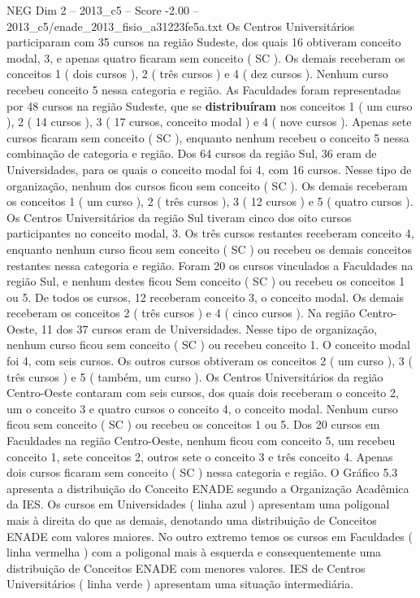 \begin{textsample}{NEG Dim 2 – 2013\_c5 – Score -2.00 – 2013\_c5/enade\_2013\_fisio\_a31223fe5a.txt}
Os Centros Universitários participaram com 35 cursos na região Sudeste, dos quais 16 obtiveram conceito modal, 3, e apenas quatro ficaram sem conceito ( SC ).
Os demais receberam os conceitos 1 ( dois cursos ), 2 ( três cursos ) e 4 ( dez cursos ).
Nenhum curso recebeu conceito 5 nessa categoria e região.
As Faculdades foram representadas por 48 cursos na região Sudeste, que se \textbf{distribuíram} nos conceitos 1 ( um curso ), 2 ( 14 cursos ), 3 ( 17 cursos, conceito modal ) e 4 ( nove cursos ).
Apenas sete cursos ficaram sem conceito ( SC ), enquanto nenhum recebeu o conceito 5 nessa combinação de categoria e região.
Dos 64 cursos da região Sul, 36 eram de Universidades, para os quais o conceito modal foi 4, com 16 cursos.
Nesse tipo de organização, nenhum dos cursos ficou sem conceito ( SC ).
Os demais receberam os conceitos 1 ( um curso ), 2 ( três cursos ), 3 ( 12 cursos ) e 5 ( quatro cursos ).
Os Centros Universitários da região Sul tiveram cinco dos oito cursos participantes no conceito modal, 3.
Os três cursos restantes receberam conceito 4, enquanto nenhum curso ficou sem conceito ( SC ) ou recebeu os demais conceitos restantes nessa categoria e região.
Foram 20 os cursos vinculados a Faculdades na região Sul, e nenhum destes ficou Sem conceito ( SC ) ou recebeu os conceitos 1 ou 5.
De todos os cursos, 12 receberam conceito 3, o conceito modal.
Os demais receberam os conceitos 2 ( três cursos ) e 4 ( cinco cursos ).
Na região Centro-Oeste, 11 dos 37 cursos eram de Universidades.
Nesse tipo de organização, nenhum curso ficou sem conceito ( SC ) ou recebeu conceito 1.
O conceito modal foi 4, com seis cursos.
Os outros cursos obtiveram os conceitos 2 ( um curso ), 3 ( três cursos ) e 5 ( também, um curso ).
Os Centros Universitários da região Centro-Oeste contaram com seis cursos, dos quais dois receberam o conceito 2, um o conceito 3 e quatro cursos o conceito 4, o conceito modal.
Nenhum curso ficou sem conceito ( SC ) ou recebeu os conceitos 1 ou 5.
Dos 20 cursos em Faculdades na região Centro-Oeste, nenhum ficou com conceito 5, um recebeu conceito 1, sete conceitos 2, outros sete o conceito 3 e três conceito 4.
Apenas dois cursos ficaram sem conceito ( SC ) nessa categoria e região.
O Gráfico 5.3 apresenta a distribuição do Conceito ENADE segundo a Organização Acadêmica da IES.
Os cursos em Universidades ( linha azul ) apresentam uma poligonal mais à direita do que as demais, denotando uma distribuição de Conceitos ENADE com valores maiores.
No outro extremo temos os cursos em Faculdades ( linha vermelha ) com a poligonal mais à esquerda e consequentemente uma distribuição de Conceitos ENADE com menores valores.
IES de Centros Universitários ( linha verde ) apresentam uma situação intermediária.

\end{textsample}
